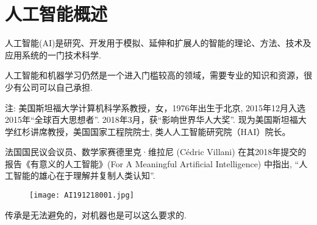 \chapter{人工智能概述}
\begin{tcolorbox}[colback=white!50,colframe=orange!50,title=人工智能]
\begin{center}
   人工智能(AI)是研究、开发用于模拟、延伸和扩展人的智能的理论、方法、技术及应用系统的一门技术科学.\hfill
\end{center}
\end{tcolorbox}
\begin{tcolorbox}[colback=white!50, colframe=orange!50, title=李飞飞]
\begin{center}
   人工智能和机器学习仍然是一个进入门槛较高的领域，需要专业的知识和资源，很少有公司可以自己承担.\hfill
\end{center}
\end{tcolorbox}
注: 美国斯坦福大学计算机科学系教授，女，1976年出生于北京, 2015年12月入选2015年“全球百大思想者”. 2018年3月，获“影响世界华人大奖”.
现为美国斯坦福大学红杉讲席教授，美国国家工程院院士, 类人人工智能研究院（HAI）院长。

法国国民议会议员、数学家赛德里克·维拉尼 (Cédric Villani) 在其2018年提交的报告《有意义的人工智能》(For A Meaningful Artificial Intelligence) 中指出, “人工智能的雄心在于理解并复制人类认知”.
\begin{figure}[H]
\centering
\texttt{[image: AI191218001.jpg]}
\label{AI191218001}
\end{figure}
\begin{tcolorbox}[colback=white!50, colframe=orange!50, title=无名氏]
\begin{center}
   传承是无法避免的，对机器也是可以这么要求的.\hfill
\end{center}
\end{tcolorbox}
